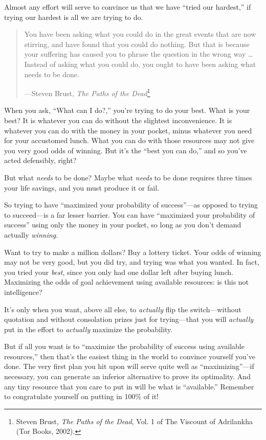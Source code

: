 {
 Almost any effort will serve to convince us that we have
``tried our hardest,'' if trying our
hardest is all we are trying to do.}

\begin{quote}
{
 You have been asking what you could do in the great events that
are now stirring, and have found that you could do nothing. But that is
because your suffering has caused you to phrase the question in the
wrong way \ldots Instead of asking what you could do, you ought to have
been asking what needs to be done.}

{\raggedleft
 {}---Steven Brust, \textit{The Paths of the
Dead}\footnote{Steven Brust, \textit{The Paths of the Dead}, Vol. 1 of The
Viscount of Adrilankha (Tor Books, 2002).}
\par}
\end{quote}


{
 When you ask, ``What can I
do?,'' you're trying to do your best.
What is your best? It is whatever you can do without the slightest
inconvenience. It is whatever you can do with the money in your pocket,
minus whatever you need for your accustomed lunch. What you can do with
those resources may not give you very good odds of winning. But
it's the ``best you can
do,'' and so you've acted defensibly,
right?}

{
 But what \textit{needs} to be done? Maybe what \textit{needs} to
be done requires three times your life savings, and you must produce it
or fail.}

{
 So trying to have ``maximized your probability of
success''---as opposed to trying to succeed---is a
far lesser barrier. You can have ``maximized your
probability of success'' using only the money in your
pocket, so long as you don't demand actually
\textit{winning.}}

{
 Want to try to make a million dollars? Buy a lottery ticket. Your
odds of winning may not be very good, but you did try, and trying was
what you wanted. In fact, you tried your \textit{best}, since you only
had one dollar left after buying lunch. Maximizing the odds of goal
achievement using available resources: is this not intelligence?}

{
 It's only when you want, above all else, to
\textit{actually} flip the switch---without quotation and without
consolation prizes just for trying---that you will \textit{actually}
put in the effort to \textit{actually} maximize the probability.}

{
 But if all you want is to ``maximize the
probability of success using available resources,''
then that's the easiest thing in the world to convince
yourself you've done. The very first plan you hit upon
will serve quite well as
``maximizing''---if necessary, you
can generate an inferior alternative to prove its optimality. And any
tiny resource that you care to put in will be what is
``available.'' Remember to
congratulate yourself on putting in 100\% of it!}

